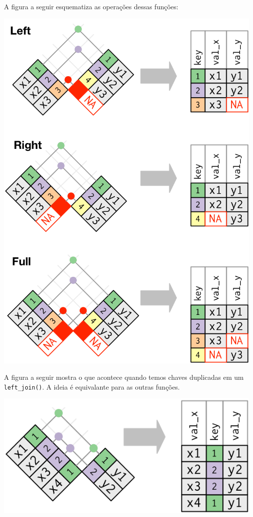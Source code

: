 \documentclass[]{book}
\begin{document}
A figura a seguir esquematiza as operações dessas funções:

\begin{center}\includegraphics[width=9.86in]{img/manipulacao/joins} \end{center}

A figura a seguir mostra o que acontece quando temos chaves duplicadas em um \texttt{left\_join()}. A ideia é equivalante para as outras funções.

\begin{center}\includegraphics[width=7.75in]{img/manipulacao/left-join} \end{center}
\end{document}
